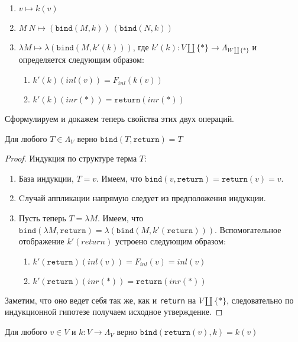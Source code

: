 \begin{enumerate}
  \item $v \mapsto k(v)$
  \item $M\ N \mapsto (\texttt{bind}(M, k))\ (\texttt{bind}(N, k))$
  \item $\lambda M \mapsto \lambda(\texttt{bind}(M, k'(k)))$, где $k'(k) : V \coprod \{*\} \to \Lambda_{W \coprod \{*\}}$ и определяется следующим образом:
    \begin{enumerate}
      \item $k'(k)(inl(v)) = F_{inl}(k(v))$
      \item $k'(k)(inr(*)) = \texttt{return}(inr(*))$
    \end{enumerate}
\end{enumerate}


Сформулируем и докажем теперь свойства этих двух операций.

\begin{prop}
  Для любого $T \in \Lambda_{V}$ верно $\texttt{bind}(T, \texttt{return}) = T$
\end{prop}

\begin{proof}
  Индукция по структуре терма $T$:
  \begin{enumerate}
    \item База индукции, $T = v$. Имеем, что $\texttt{bind}(v, \texttt{return}) = \texttt{return}(v) = v$.
    \item Cлучай аппликации напрямую следует из предположения индукции.
    \item Пусть теперь $T = \lambda M$. Имеем, что $\texttt{bind}(\lambda M, \texttt{return}) = \lambda (\texttt{bind}(M, k'(\texttt{return})))$. Вспомогательное отображение $k'(return)$ устроено следующим образом:
    \begin{enumerate}
      \item $k'(\texttt{return})(inl(v)) = F_{inl}(v) = inl(v)$
      \item $k'(\texttt{return})(inr(*)) = \texttt{return}(inr(*))$
    \end{enumerate}
  \end{enumerate}

  Заметим, что оно ведет себя так же, как и \texttt{return} на $V \coprod \{*\}$, следовательно по индукционной гипотезе получаем исходное утверждение.
\end{proof}

\begin{prop}
  Для любого $v \in V$ и $k : V \to \Lambda_{V}$ верно $\texttt{bind}(\texttt{return}(v), k) = k(v)$
\end{prop}

